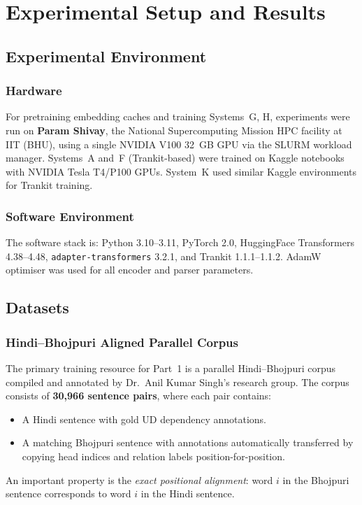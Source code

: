 \documentclass[12pt,a4paper,oneside]{report}
\begin{document}
\chapter{Experimental Setup and Results}
\label{chap:experiments}

\section{Experimental Environment}

\subsection{Hardware}

For pretraining embedding caches and training Systems~G, H, experiments were run
on \textbf{Param Shivay}, the National Supercomputing Mission HPC facility at IIT
(BHU), using a single NVIDIA V100 32~GB GPU via the SLURM workload manager.
Systems~A and~F (Trankit-based) were trained on Kaggle notebooks with NVIDIA Tesla
T4/P100 GPUs. System~K used similar Kaggle environments for Trankit training.

\subsection{Software Environment}

The software stack is: Python 3.10--3.11, PyTorch 2.0, HuggingFace Transformers
4.38--4.48, \texttt{adapter-transformers} 3.2.1, and Trankit 1.1.1--1.1.2.
AdamW optimiser was used for all encoder and parser parameters.

\section{Datasets}
\label{sec:datasets}

\subsection{Hindi--Bhojpuri Aligned Parallel Corpus}

The primary training resource for Part~1 is a parallel Hindi--Bhojpuri corpus
compiled and annotated by Dr.\ Anil Kumar Singh's research group. The corpus
consists of \textbf{30,966 sentence pairs}, where each pair contains:
\begin{itemize}
  \item A Hindi sentence with gold UD dependency annotations.
  \item A matching Bhojpuri sentence with annotations automatically transferred by
        copying head indices and relation labels position-for-position.
\end{itemize}
An important property is the \emph{exact positional alignment}: word $i$ in the
Bhojpuri sentence corresponds to word $i$ in the Hindi sentence.
\end{document}
